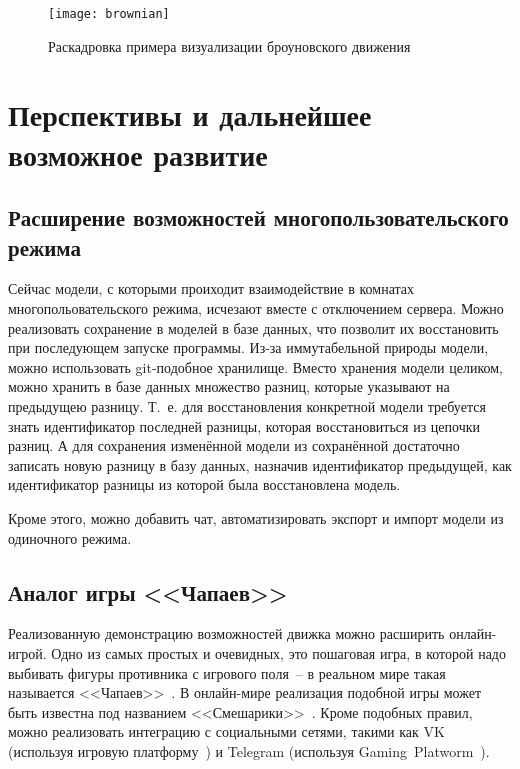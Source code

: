 \begin{figure}[H]
    \centering
    \texttt{[image: brownian]}
    \caption{Раскадровка примера визуализации броуновского движения\label{brownianfig}}
\end{figure}

\section{Перспективы и дальнейшее возможное развитие}

\subsection{Расширение возможностей многопользовательского режима}

Сейчас модели, с которыми проиходит взаимодействие в комнатах многопольовательского режима, исчезают вместе с отключением сервера.
Можно реализовать сохранение в моделей в базе данных, что позволит их восстановить при последующем запуске программы.
Из-за иммутабельной природы модели, можно использовать git-подобное хранилище.
Вместо хранения модели целиком, можно хранить в базе данных множество разниц, которые указывают на предыдущею разницу.
Т.~е. для восстановления конкретной модели требуется знать идентификатор последней разницы, которая восстановиться из цепочки разниц.
А для сохранения изменённой модели из сохранённой достаточно записать новую разницу в базу данных,
назначив идентификатор предыдущей, как идентификатор разницы из которой была восстановлена модель.

Кроме этого, можно добавить чат, автоматизировать экспорт и импорт модели из одиночного режима.

\subsection{Аналог игры <<Чапаев>>}

Реализованную демонстрацию возможностей движка можно расширить онлайн-игрой.
Одно из самых простых и очевидных, это пошаговая игра, в которой надо выбивать фигуры противника с игрового поля~--
в реальном мире такая называется <<Чапаев>>~\cite{wiki-chapaev}.
В онлайн-мире реализация подобной игры может быть известна под названием <<Смешарики>>~\cite{smeshariki-fandom}.
Кроме подобных правил, можно реализовать интеграцию с социальными сетями, такими как
VK (используя игровую платформу~\cite{vk-games}) и Telegram (используя Gaming~Platworm~\cite{tg-games}).

